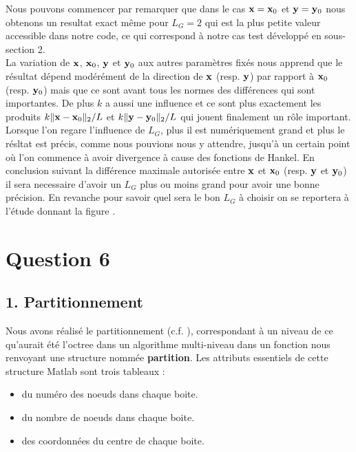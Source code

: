 \documentclass[10pt]{article}
\begin{document}

\begin{multicols}{2}

Nous pouvons commencer par remarquer que dans le cas ${\bf x}={\bf x}_0$ et ${\bf y}={\bf y}_0$ nous obtenons un resultat exact même pour $L_G=2$ qui est la plus petite valeur accessible dans notre code, ce qui correspond à notre cas test développé en sous-section 2.\\
\indent
La variation de ${\bf x}$, ${\bf x}_0$, ${\bf y}$ et ${\bf y}_0$ aux autres paramètres fixés nous apprend que le résultat dépend modérément de la direction de ${\bf x}$ (resp. ${\bf y}$) par rapport à ${\bf x}_0$ (resp. ${\bf y}_0$) mais que ce sont avant tous les normes des différences qui sont importantes. De plus $k$ a aussi une influence et ce sont plus exactement les produits $k\|{\bf x}-{\bf x}_0\|_{2}/L$ et $k\|{\bf y}-{\bf y}_0\|_{2}/L$ qui jouent finalement un rôle important. \\
\indent
Lorsque l'on regare l'influence de $L_G$, plus il est numériquement grand et plus le résltat est précis, comme nous pouvions nous y attendre, jusqu'à un certain point où l'on commence à avoir divergence à cause des fonctions de Hankel. En conclusion suivant la différence maximale autorisée entre ${\bf x}$ et ${\bf x}_0$ (resp. ${\bf y}$ et ${\bf y}_0$) il sera necessaire d'avoir un $L_G$ plus ou moins grand pour avoir une bonne précision. En revanche pour savoir quel sera le bon $L_G$ à choisir on se reportera à l'étude donnant la figure . 

\vspace*{11pt}


\section*{Question 6}

\subsection*{1. Partitionnement}

Nous avons réalisé le partitionnement (c.f. ), correspondant à un niveau de ce qu'aurait été l'octree dans un algorithme multi-niveau dans un fonction nous renvoyant une structure nommée \textbf{partition}. Les attributs essentiels de cette structure Matlab sont trois tableaux : \\

\begin{itemize}
\item du numéro des noeuds dans chaque boite. 
\item du nombre de noeuds dans chaque boite.
\item des coordonnées du centre de chaque boite. 
\end{itemize}


\end{multicols}
\end{document}
